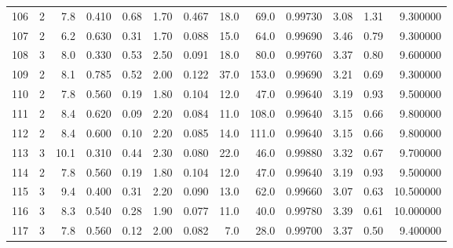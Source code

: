 \begin{tabular}{lrrrrrrrrrrrr}
106  &        2 &            7.8 &             0.410 &         0.68 &            1.70 &      0.467 &                 18.0 &                  69.0 &  0.99730 &  3.08 &       1.31 &   9.300000 \\
107  &        2 &            6.2 &             0.630 &         0.31 &            1.70 &      0.088 &                 15.0 &                  64.0 &  0.99690 &  3.46 &       0.79 &   9.300000 \\
108  &        3 &            8.0 &             0.330 &         0.53 &            2.50 &      0.091 &                 18.0 &                  80.0 &  0.99760 &  3.37 &       0.80 &   9.600000 \\
109  &        2 &            8.1 &             0.785 &         0.52 &            2.00 &      0.122 &                 37.0 &                 153.0 &  0.99690 &  3.21 &       0.69 &   9.300000 \\
110  &        2 &            7.8 &             0.560 &         0.19 &            1.80 &      0.104 &                 12.0 &                  47.0 &  0.99640 &  3.19 &       0.93 &   9.500000 \\
111  &        2 &            8.4 &             0.620 &         0.09 &            2.20 &      0.084 &                 11.0 &                 108.0 &  0.99640 &  3.15 &       0.66 &   9.800000 \\
112  &        2 &            8.4 &             0.600 &         0.10 &            2.20 &      0.085 &                 14.0 &                 111.0 &  0.99640 &  3.15 &       0.66 &   9.800000 \\
113  &        3 &           10.1 &             0.310 &         0.44 &            2.30 &      0.080 &                 22.0 &                  46.0 &  0.99880 &  3.32 &       0.67 &   9.700000 \\
114  &        2 &            7.8 &             0.560 &         0.19 &            1.80 &      0.104 &                 12.0 &                  47.0 &  0.99640 &  3.19 &       0.93 &   9.500000 \\
115  &        3 &            9.4 &             0.400 &         0.31 &            2.20 &      0.090 &                 13.0 &                  62.0 &  0.99660 &  3.07 &       0.63 &  10.500000 \\
116  &        3 &            8.3 &             0.540 &         0.28 &            1.90 &      0.077 &                 11.0 &                  40.0 &  0.99780 &  3.39 &       0.61 &  10.000000 \\
117  &        3 &            7.8 &             0.560 &         0.12 &            2.00 &      0.082 &                  7.0 &                  28.0 &  0.99700 &  3.37 &       0.50 &   9.400000 \\

\end{tabular}
